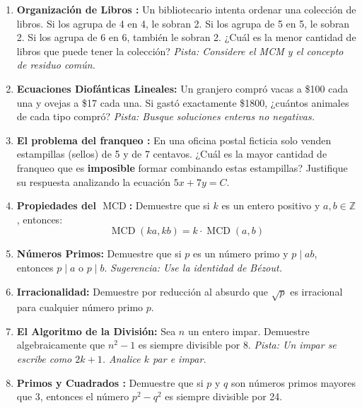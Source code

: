 \begin{enumerate}
    \item \textbf{Organización de Libros :}
    Un bibliotecario intenta ordenar una colección de libros. Si los agrupa de 4 en 4, le sobran 2. Si los agrupa de 5 en 5, le sobran 2. Si los agrupa de 6 en 6, también le sobran 2. ¿Cuál es la menor cantidad de libros que puede tener la colección?
    \textit{Pista: Considere el MCM y el concepto de residuo común.}


    \item \textbf{Ecuaciones Diofánticas Lineales:}
    Un granjero compró vacas a \$100 cada una y ovejas a \$17 cada una. Si gastó exactamente \$1800, ¿cuántos animales de cada tipo compró?
    \textit{Pista: Busque soluciones enteras no negativas.}

    \item \textbf{El problema del franqueo :}
    En una oficina postal ficticia solo venden estampillas (sellos) de 5 y de 7 centavos. ¿Cuál es la mayor cantidad de franqueo que es \textbf{imposible} formar combinando estas estampillas? Justifique su respuesta analizando la ecuación $5x + 7y = C$.


    \item \textbf{Propiedades del $\operatorname{MCD}$:}
    Demuestre que si $k$ es un entero positivo y $a, b \in \mathbb{Z}$, entonces:
    \[ \operatorname{MCD}(ka, kb) = k \cdot \operatorname{MCD}(a, b) \]

    \item \textbf{Números Primos:}
    Demuestre que si $p$ es un número primo y $p \mid ab$, entonces $p \mid a$ o $p \mid b$. 
    \textit{Sugerencia: Use la identidad de Bézout.}

    \item \textbf{Irracionalidad:}
    Demuestre por reducción al absurdo que $\sqrt{p}$ es irracional para cualquier número primo $p$. 

    \item \textbf{El Algoritmo de la División:}
    Sea $n$ un entero impar. Demuestre algebraicamente que $n^2 - 1$ es siempre divisible por 8.
    \textit{Pista: Un impar se escribe como $2k+1$. Analice $k$ par e impar.}

    \item \textbf{Primos y Cuadrados :}
    Demuestre que si $p$ y $q$ son números primos mayores que 3, entonces el número $p^2 - q^2$ es siempre divisible por 24.


\end{enumerate}
